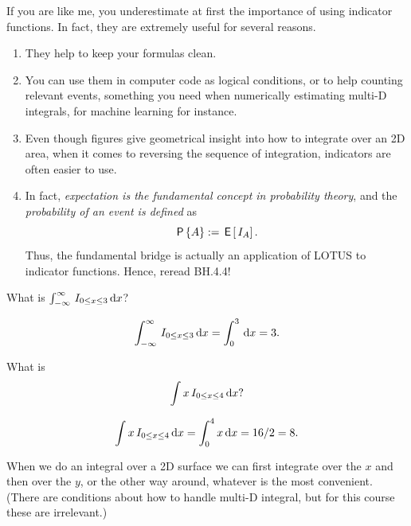 \begin{remark}
If you are like me, you underestimate at first the importance of using indicator functions. In fact, they are extremely useful for several reasons.
\begin{enumerate}
\item  They help to keep your formulas clean.
\item You can use them in computer code as logical conditions, or to help counting relevant events, something you need when numerically estimating multi-D integrals,  for machine learning for instance.
\item  Even though figures give geometrical insight into how to integrate over an 2D area, when it comes to reversing the sequence of integration, indicators are often easier to use.
\item In fact, \emph{expectation is the fundamental concept in probability theory}, and the \emph{probability of an event is defined} as
\begin{equation}
  \label{eq:84}
  \,\mathsf{P}\left\{A\right\} := \,\mathsf{E}\left[\,I_{A}\right].
\end{equation}
Thus, the fundamental bridge is actually an application of LOTUS to indicator functions. Hence, reread BH.4.4!
\end{enumerate}
\end{remark}

\begin{exercise}
What is $\int_{-\infty}^{\infty} \,I_{0\leq x \leq 3} \,\textrm{d}x$?
\begin{solution}
\begin{align*}
\int_{-\infty}^{\infty} \,I_{0\leq x \leq 3} \,\textrm{d}x =\int_{0}^{3}  \,\textrm{d}x  = 3.
\end{align*}
\end{solution}
\end{exercise}

\begin{exercise}
What is
\begin{equation}
\label{eq:85}
\int x \,I_{0\leq x \leq 4} \,\textrm{d}x?
\end{equation}
\begin{solution}
\begin{align*}
\int x \,I_{0\leq x \leq 4} \,\textrm{d}x  = \int_{0}^{4} x \,\textrm{d}x = 16/2 = 8.
\end{align*}
\end{solution}
\end{exercise}

When we do an integral over a 2D surface we can first integrate over the $x$ and then over the $y$, or the other way around, whatever is the most convenient.
(There are conditions about how to handle multi-D integral, but for this course these are irrelevant.)

